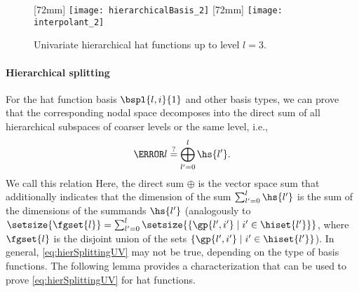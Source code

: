 \begin{figure}
  [72mm]{%
    \texttt{[image: hierarchicalBasis\_2]}%
  }%
  \hfill%
  [72mm]{%
    \texttt{[image: interpolant\_2]}%
  }%
  \caption[%
    Univariate hierarchical hat functions%
  ]{%
    Univariate hierarchical hat functions up to level $l = 3$.%
  }%
  \label{fig:hierarchicalHat}%
\end{figure}

\paragraph{Hierarchical splitting}

For the hat function basis $\bspl{l,i}{1}$ and other basis types,
we can prove that the corresponding nodal space
decomposes into the direct sum of all
hierarchical subspaces of coarser levels or the same level, i.e.,
\begin{equation}
  \label{eq:hierSplittingUV}
  \ns{l}
  \overset{?}{=} \bigoplus_{l'=0}^l \hs{l'}.
\end{equation}
We call this relation 
Here, the direct sum $\oplus$ is
the vector space sum that additionally indicates
that the dimension of the sum $\sum_{l'=0}^l \hs{l'}$ is the sum
of the dimensions of the summands $\hs{l'}$
(analogously to
$\setsize{\fgset{l}}
= \sum_{l'=0}^l \setsize{\{\gp{l',i'} \mid i' \in \hiset{l'}\}}$,
where $\fgset{l}$ is the disjoint union of the sets
$\{\gp{l',i'} \mid i' \in \hiset{l'}\}$).
In general, \eqref{eq:hierSplittingUV} may not be true,
depending on the type of basis functions.
The following lemma provides a characterization
that can be used to prove \eqref{eq:hierSplittingUV} for hat functions.

\vspace*{\fill}
\pagebreak


